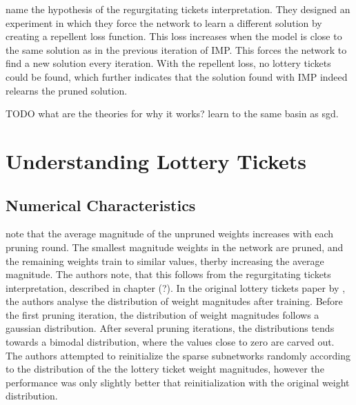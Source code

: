 \textcite{maene_towards_2021} name the hypothesis of \autocite{WhyLotteryTicketsWin} the regurgitating tickets interpretation.
They designed an experiment in which they force the network to learn a different solution by creating a repellent loss function.
This loss increases when the model is close to the same solution as in the previous iteration of IMP.
This forces the network to find a new solution every iteration.
With the repellent loss, no lottery tickets could be found, which further indicates that the solution found with IMP indeed relearns the pruned solution.

TODO what are the theories for why it works? learn to the same basin as sgd.

\section{Understanding Lottery Tickets}
\subsection{Numerical Characteristics}
\autocite{maene_towards_2021} note that the average magnitude of the unpruned weights increases with each pruning round. The smallest magnitude weights in the network are pruned, and the remaining weights train to similar values, therby increasing the average magnitude. The authors note, that this follows from the regurgitating tickets interpretation, described in chapter (?).
In the original lottery tickets paper by \textcite{DBLP:conf/iclr/FrankleC19}, the authors analyse the distribution of weight magnitudes after training. Before the first pruning iteration, the distribution of weight magnitudes follows a gaussian distribution. After several pruning iterations, the distributions tends towards a bimodal distribution, where the values close to zero are carved out.
The authors attempted to reinitialize the sparse subnetworks randomly according to the distribution of the the lottery ticket weight magnitudes, however the performance was only slightly better that reinitialization with the original weight distribution.

